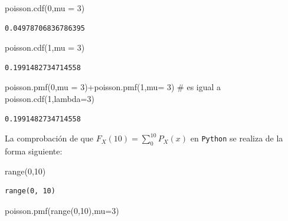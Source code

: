 \documentclass[
  letterpaper,
  DIV=11,
  numbers=noendperiod]{scrreprt}
\newenvironment{Shaded}{\begin{snugshade}}{\end{snugshade}}
\newcommand{\BuiltInTok}[1]{\textcolor[rgb]{0.00,0.23,0.31}{#1}}
\newcommand{\CommentTok}[1]{\textcolor[rgb]{0.37,0.37,0.37}{#1}}
\newcommand{\DecValTok}[1]{\textcolor[rgb]{0.68,0.00,0.00}{#1}}
\newcommand{\NormalTok}[1]{\textcolor[rgb]{0.00,0.23,0.31}{#1}}
\newcommand{\OperatorTok}[1]{\textcolor[rgb]{0.37,0.37,0.37}{#1}}
\begin{document}
\begin{Shaded}
\begin{Highlighting}[]
\NormalTok{poisson.cdf(}\DecValTok{0}\NormalTok{,mu }\OperatorTok{=} \DecValTok{3}\NormalTok{)}
\end{Highlighting}
\end{Shaded}

\begin{verbatim}
0.04978706836786395
\end{verbatim}

\begin{Shaded}
\begin{Highlighting}[]
\NormalTok{poisson.cdf(}\DecValTok{1}\NormalTok{,mu }\OperatorTok{=} \DecValTok{3}\NormalTok{)}
\end{Highlighting}
\end{Shaded}

\begin{verbatim}
0.1991482734714558
\end{verbatim}

\begin{Shaded}
\begin{Highlighting}[]
\NormalTok{poisson.pmf(}\DecValTok{0}\NormalTok{,mu }\OperatorTok{=} \DecValTok{3}\NormalTok{)}\OperatorTok{+}\NormalTok{poisson.pmf(}\DecValTok{1}\NormalTok{,mu}\OperatorTok{=} \DecValTok{3}\NormalTok{) }\CommentTok{\# es igual a poisson.cdf(1,lambda=3)}
\end{Highlighting}
\end{Shaded}

\begin{verbatim}
0.1991482734714558
\end{verbatim}

La comprobación de que \(F_X(10)=\displaystyle\sum_{0}^{10} P_X(x)\) en
\texttt{Python} se realiza de la forma siguiente:

\begin{Shaded}
\begin{Highlighting}[]
\BuiltInTok{range}\NormalTok{(}\DecValTok{0}\NormalTok{,}\DecValTok{10}\NormalTok{)}
\end{Highlighting}
\end{Shaded}

\begin{verbatim}
range(0, 10)
\end{verbatim}

\begin{Shaded}
\begin{Highlighting}[]
\NormalTok{poisson.pmf(}\BuiltInTok{range}\NormalTok{(}\DecValTok{0}\NormalTok{,}\DecValTok{10}\NormalTok{),mu}\OperatorTok{=}\DecValTok{3}\NormalTok{)}
\end{Highlighting}
\end{Shaded}
\end{document}
